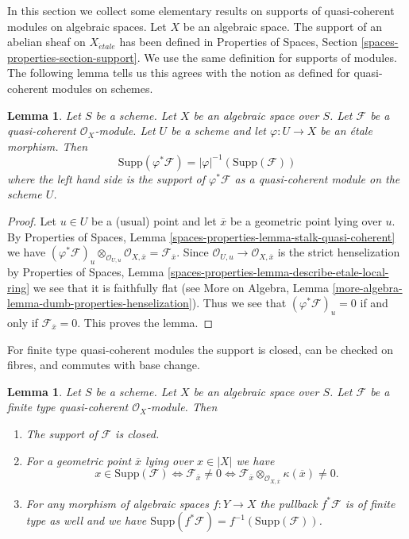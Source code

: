 \documentclass{stacks-project}
\theoremstyle{plain}
\newtheorem{lemma}[subsection]{Lemma}
\theoremstyle{definition}
\theoremstyle{remark}
\numberwithin{equation}{subsection}
\def\etale{{\acute{e}tale}}
\begin{document}
\noindent
In this section we collect some elementary results on supports of
quasi-coherent modules on algebraic spaces. Let $X$ be an algebraic
space. The support of an abelian sheaf on $X_\etale$
has been defined in Properties of Spaces, Section
\ref{spaces-properties-section-support}.
We use the same definition for supports of modules.
The following lemma tells us this agrees with the notion
as defined for quasi-coherent modules on schemes.

\begin{lemma}
\label{lemma-support-covering}
Let $S$ be a scheme. Let $X$ be an algebraic space over $S$.
Let $\mathcal{F}$ be a quasi-coherent $\mathcal{O}_X$-module.
Let $U$ be a scheme and let $\varphi : U \to X$ be an \'etale morphism.
Then
$$
\text{Supp}(\varphi^*\mathcal{F}) = |\varphi|^{-1}(\text{Supp}(\mathcal{F}))
$$
where the left hand side is the support of $\varphi^*\mathcal{F}$ as a
quasi-coherent module on the scheme $U$.
\end{lemma}

\begin{proof}
Let $u\in U$ be a (usual) point and let $\overline{x}$ be a
geometric point lying over $u$. By
Properties of Spaces, Lemma \ref{spaces-properties-lemma-stalk-quasi-coherent}
we have
$(\varphi^*\mathcal{F})_u \otimes_{\mathcal{O}_{U, u}}
\mathcal{O}_{X, \overline{x}} = \mathcal{F}_{\overline{x}}$.
Since $\mathcal{O}_{U, u} \to \mathcal{O}_{X, \overline{x}}$
is the strict henselization by
Properties of Spaces, Lemma
\ref{spaces-properties-lemma-describe-etale-local-ring}
we see that it is faithfully flat (see
More on Algebra, Lemma
\ref{more-algebra-lemma-dumb-properties-henselization}).
Thus we see that $(\varphi^*\mathcal{F})_u = 0$ if and only if
$\mathcal{F}_{\overline{x}} = 0$. This proves the lemma.
\end{proof}

\noindent
For finite type quasi-coherent modules the support is closed,
can be checked on fibres, and commutes with base change.

\begin{lemma}
\label{lemma-support-finite-type}
Let $S$ be a scheme. Let $X$ be an algebraic space over $S$.
Let $\mathcal{F}$ be a finite type quasi-coherent $\mathcal{O}_X$-module.
Then
\begin{enumerate}
\item The support of $\mathcal{F}$ is closed.
\item For a geometric point $\overline{x}$ lying over $x \in |X|$ we have
$$
x \in \text{Supp}(\mathcal{F})
\Leftrightarrow
\mathcal{F}_{\overline{x}} \not = 0
\Leftrightarrow
\mathcal{F}_{\overline{x}} \otimes_{\mathcal{O}_{X, \overline{x}}}
\kappa(\overline{x}) \not = 0.
$$
\item For any morphism of algebraic spaces $f : Y \to X$ the pullback
$f^*\mathcal{F}$ is of finite type as well and we have
$\text{Supp}(f^*\mathcal{F}) = f^{-1}(\text{Supp}(\mathcal{F}))$.
\end{enumerate}
\end{lemma}
\end{document}
